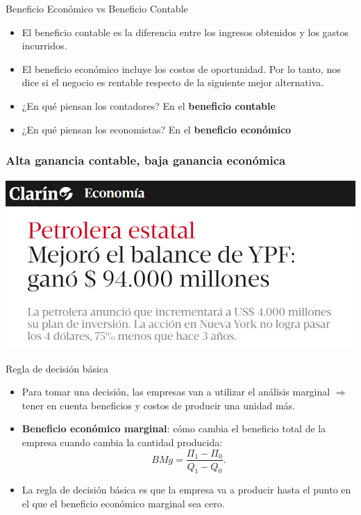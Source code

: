 \documentclass{beamer}
\begin{document}
\begin{frame}{Beneficio Económico vs Beneficio Contable}
    \begin{itemize}
        \item El beneficio contable es la diferencia entre los ingresos obtenidos y los gastos incurridos. \vspace{2mm} 
        \item El beneficio económico incluye los costos de oportunidad. Por lo tanto, nos dice si el negocio es rentable respecto de la siguiente mejor alternativa. \vspace{2mm} 
        \item ¿En qué piensan los contadores? En el \textbf{beneficio contable} \vspace{2mm} 
        \item ¿En qué piensan los economistas? En el \textbf{beneficio económico} \vspace{2mm} 
    \end{itemize}
\end{frame}

\begin{frame}
    \frametitle{Alta ganancia contable, baja ganancia económica}
    \centering
    \includegraphics[scale=0.5]{../Figures/YPF.png}
\end{frame}

\begin{frame}{Regla de decisión básica}

    \begin{itemize}
        \item Para tomar una decisión, las empresas van a utilizar el análisis marginal $\Rightarrow$ tener en cuenta beneficios y costos de producir una unidad más.
        \item \textbf{Beneficio económico marginal}: cómo cambia el beneficio total de la empresa cuando cambia la cantidad producida: \\
        \[
        BMg = \frac{\Pi_1 - \Pi_0}{Q_1 - Q_0}.
        \]
        \item La regla de decisión básica es que la empresa va a producir hasta el punto en el que el beneficio económico marginal sea cero.
    \end{itemize}
\end{frame}
\end{document}
